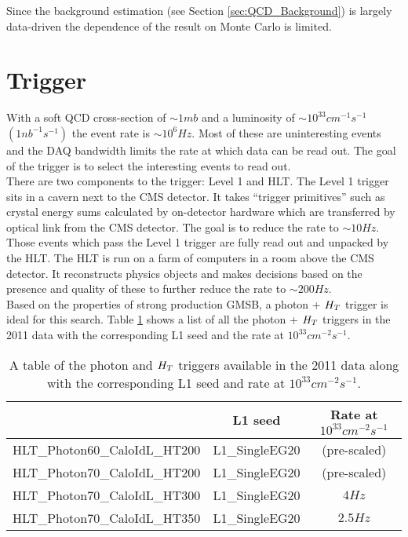 Since the background estimation (see Section \ref{sec:QCD_Background}) is 
largely data-driven the dependence of the result on Monte Carlo is limited. \\

\section{Trigger}

With a soft QCD cross-section of $\sim1\unit{mb}$ and a luminosity of $\sim 
10^{33}\unit{cm^{-1}s^{-1}}$ $(1\unit{nb^{-1}s^{-1}})$ the event rate is $\sim
10^{6} \unit{Hz}$. 
Most of these are uninteresting events and the DAQ bandwidth limits the rate at 
which data can be read out. The goal of the trigger is to select the interesting 
events to read out. \\

There are two components to the trigger: Level 1 and HLT. The Level 1 trigger
sits in a cavern next to the CMS detector. It takes ``trigger primitives'' such
as crystal energy sums calculated by on-detector hardware which are transferred 
by optical link from the CMS detector. The goal is to reduce the rate to $\sim 
10\unit{Hz}$. Those events which pass the Level 1 trigger are fully read out and
unpacked by the HLT. The HLT is run on a farm of computers in a room above the 
CMS detector. It reconstructs physics objects and makes decisions based on the 
presence and quality of these to further reduce the rate to $\sim 200\unit{Hz}$. \\

Based on the properties of strong production GMSB, a photon + $H_{T}$ trigger 
is ideal for this search. Table \ref{tab:Triggers} shows a list of all the 
photon + $H_{T}$ triggers in the 2011 data with the corresponding L1 seed and the
rate at $10^{33}\unit{cm^{-2}s^{-1}}$. \\

\begin{table}
\begin{center}
\begin{tabular}{|l|c|c|}
\hline
 & L1 seed & Rate at $10^{33}\unit{cm^{-2}s^{-1}}$ \\
\hline
HLT\_Photon60\_CaloIdL\_HT200 & L1\_SingleEG20 & (pre-scaled) \\
HLT\_Photon70\_CaloIdL\_HT200 & L1\_SingleEG20 & (pre-scaled) \\
HLT\_Photon70\_CaloIdL\_HT300 & L1\_SingleEG20 & $4\unit{Hz}$ \\
HLT\_Photon70\_CaloIdL\_HT350 & L1\_SingleEG20 & $2.5\unit{Hz}$ \\
\hline
\end{tabular}
\end{center}
\caption{A table of the photon and $H_{T}$ triggers available in the 2011 data
along with the corresponding L1 seed and rate at $10^{33}\unit{cm^{-2}s^{-1}}$.}
\label{tab:Triggers}
\end{table}

